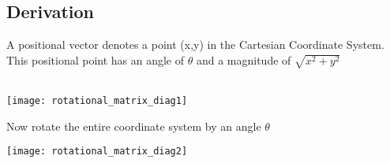 \documentclass[11pt]{book}
\begin{document}
\subsection{Derivation}
A positional vector denotes a point (x,y) in the Cartesian Coordinate System.  This positional point has an angle of \(\theta\) and a magnitude of \(\sqrt{x^2 + y^2}\) \\
\\
\begin{center}
\texttt{[image: rotational\_matrix\_diag1]}
\end{center}

Now rotate the entire coordinate system by an angle \(\theta\)\\
\begin{center}
\texttt{[image: rotational\_matrix\_diag2]}
\end{center}
\end{document}
